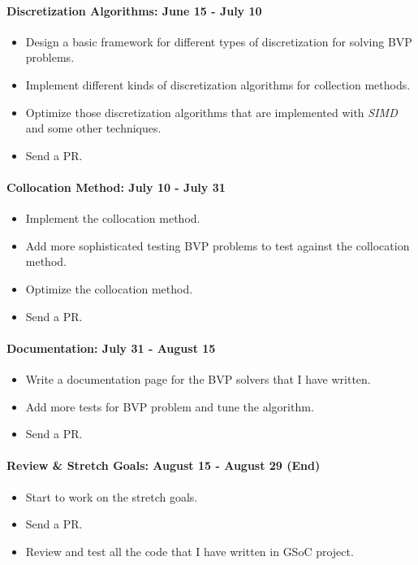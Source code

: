 \documentclass[a4paper,12pt,onecolumn]{article}
\begin{document}
\paragraph{Discretization Algorithms: June 15 - July 10} %
\label{par:discretization_algorithms}
\begin{itemize}
	\item Design a basic framework for different types of discretization for solving
	BVP problems.
	\item Implement different kinds of discretization algorithms for collection methods.
	\item Optimize those discretization algorithms that are implemented with \textit{SIMD}
	and some other techniques.
	\item Send a PR.
\end{itemize}

\paragraph{Collocation Method: July 10 - July 31} %
\label{par:least_squares_method_july_10_july_31}
\begin{itemize}
	\item Implement the collocation method.
	\item Add more sophisticated testing BVP problems to test against the collocation method.
	\item Optimize the collocation method.
	\item Send a PR.
\end{itemize}

\paragraph{Documentation: July 31 - August 15} %
\label{par:weighted_residual_method_july_31_august_15}
\begin{itemize}
	\item Write a documentation page for the BVP solvers that I have written.
	\item Add more tests for BVP problem and tune the algorithm.
	\item Send a PR.
\end{itemize}

\paragraph{Review \& Stretch Goals: August 15 - August 29 (End)} %
\label{par:review_&_stretch_goals_august_15_august_29}
\begin{itemize}
	\item Start to work on the stretch goals.
	\item Send a PR.
	\item Review and test all the code that I have written in GSoC project.
\end{itemize}
\end{document}
